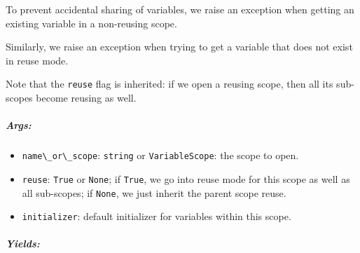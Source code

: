 To prevent accidental sharing of variables, we raise an exception when
getting an existing variable in a non-reusing scope.

\begin{Shaded}
\begin{Highlighting}[]
 \NormalTok{) } 
    \OperatorTok{=} \NormalTok{, [}\NormalTok{])}
    \OperatorTok{=} \NormalTok{, [}\NormalTok{])}
\end{Highlighting}
\end{Shaded}

Similarly, we raise an exception when trying to get a variable that does
not exist in reuse mode.

\begin{Shaded}
\begin{Highlighting}[]
 \OperatorTok{=}\NormalTok{):}
    \OperatorTok{=} \NormalTok{, [}\NormalTok{])}
\end{Highlighting}
\end{Shaded}

Note that the \lstinline{reuse} flag is inherited: if we open a reusing
scope, then all its sub-scopes become reusing as well.

\subparagraph{Args: }\label{args-17}

\begin{itemize}
\tightlist
\item
  \lstinline{name\_or\_scope}: \lstinline{string} or \lstinline{VariableScope}:
  the scope to open.
\item
  \lstinline{reuse}: \lstinline{True} or \lstinline{None}; if \lstinline{True}, we
  go into reuse mode for this scope as well as all sub-scopes; if
  \lstinline{None}, we just inherit the parent scope reuse.
\item
  \lstinline{initializer}: default initializer for variables within this
  scope.
\end{itemize}

\subparagraph{Yields: }\label{yields}

